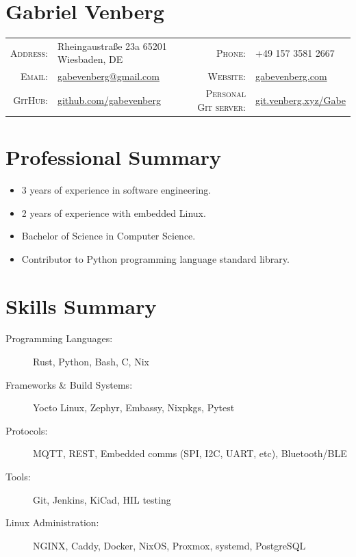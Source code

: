 \documentclass[letterpaper,10pt]{article}
\begin{document}
\pagestyle{empty}%
\section*{Gabriel Venberg}
    \begin{tabular}{r l r l}
    \textsc{Address:} & Rheingaustraße 23a 65201 Wiesbaden, DE &
    \textsc{Phone:} & +49 157 3581 2667\\
    \textsc{Email:} & \href{mailto:gabevenberg@gmail.com}{gabevenberg@gmail.com}&
    \textsc{Website:} & \href{https://gabevenberg.com}{gabevenberg.com} \\
    \textsc{GitHub:} & \href{https://github.com/gabevenberg}{github.com/gabevenberg}&
    \textsc{Personal Git server:} & \href{https://git.venberg.xyz/Gabe}{git.venberg.xyz/Gabe}\\
    \end{tabular}
\section*{Professional Summary}

\begin{itemize}
    \item 3 years of experience in software engineering.
    \item 2 years of experience with embedded Linux.
    \item Bachelor of Science in Computer Science.
    \item Contributor to Python programming language standard library.
\end{itemize}

\section*{Skills Summary}

\begin{description}
    \item[Programming Languages:] Rust, Python, Bash, C, Nix
    \item[Frameworks \& Build Systems: ] Yocto Linux, Zephyr, Embassy, Nixpkgs, Pytest
    \item[Protocols: ] MQTT, REST, Embedded comms (SPI, I2C, UART, etc), Bluetooth/BLE
    \item[Tools:] Git, Jenkins, KiCad, HIL testing
    \item[Linux Administration:] NGINX, Caddy, Docker, NixOS, Proxmox, systemd, PostgreSQL
\end{description}
\end{document}
